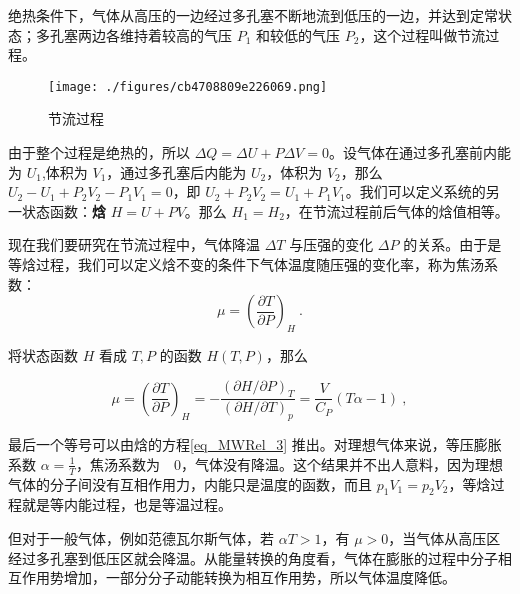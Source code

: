 

绝热条件下，气体从高压的一边经过多孔塞不断地流到低压的一边，并达到定常状态；多孔塞两边各维持着较高的气压 $P_1$ 和较低的气压 $P_2$，这个过程叫做节流过程。

\begin{figure}[ht]
\centering
\texttt{[image: ./figures/cb4708809e226069.png]}
\caption{节流过程} \label{fig_ttpro_1}
\end{figure}

由于整个过程是绝热的，所以 $\Delta Q=\Delta U+P\Delta V=0$。设气体在通过多孔塞前内能为 $U_1$,体积为 $V_1$，通过多孔塞后内能为 $U_2$，体积为 $V_2$，那么 $U_2-U_1+P_2V_2-P_1V_1=0$，即 $U_2+P_2V_2=U_1+P_1V_1$。我们可以定义系统的另一状态函数：\textbf{焓} $H=U+PV$。那么 $H_1=H_2$，在节流过程前后气体的焓值相等。

现在我们要研究在节流过程中，气体降温 $\Delta T$ 与压强的变化 $\Delta P$ 的关系。由于是等焓过程，我们可以定义焓不变的条件下气体温度随压强的变化率，称为焦汤系数：
\begin{equation}
\mu=\left(\frac{\partial T}{\partial P}\right)_H~.
\end{equation}

将状态函数 $H$ 看成 $T,P$ 的函数 $H(T,P)$，那么

\begin{equation}
\mu=\left(\frac{\partial T}{\partial P}\right)_H=
-\frac{(\partial H/\partial P)_T}{(\partial H/\partial T)_p}
=\frac{V}{C_P}(T\alpha-1)~,
\end{equation}

最后一个等号可以由焓的方程\autoref{eq_MWRel_3} 推出。对理想气体来说，等压膨胀系数 $\alpha=\frac{1}{T}$，焦汤系数为　$0$，气体没有降温。这个结果并不出人意料，因为理想气体的分子间没有互相作用力，内能只是温度的函数，而且 $p_1V_1=p_2V_2$，等焓过程就是等内能过程，也是等温过程。

但对于一般气体，例如范德瓦尔斯气体，若 $\alpha T>1$，有 $\mu>0$，当气体从高压区经过多孔塞到低压区就会降温。从能量转换的角度看，气体在膨胀的过程中分子相互作用势增加，一部分分子动能转换为相互作用势，所以气体温度降低。